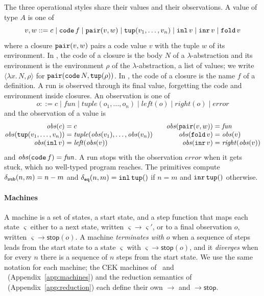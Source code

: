 The three operational styles share their values and their
observations. A value of type $A$ is one of
\[
  v, w ::= c \mid \mathtt{code}\,f \mid \mathtt{pair}(v, w) \mid \mathtt{tup}(v_1, \ldots, v_n)
    \mid \mathtt{inl}\,v \mid \mathtt{inr}\,v \mid \mathtt{fold}\,v
\]
where a closure $\mathtt{pair}(v, w)$ pairs a code value $v$ with the tuple
$w$ of its environment. In \fpc, the code of a closure is the body $N$
of a $\lambda$-abstraction and its environment is the environment
$\rho$ of the $\lambda$-abstraction, a list of values; we write
$\langle \lambda x.\,N, \rho\rangle$ for $\mathtt{pair}(\mathtt{code}\,N,
\mathtt{tup}(\rho))$. In \instr, the code of a closure is the name $f$ of a
definition. A run is observed through its final value, forgetting the
code and environment inside closures. An observation is one of
\[
  o ::= c \mid \mathit{fun} \mid \mathit{tuple}(o_1, \ldots, o_n)
    \mid \mathit{left}(o) \mid \mathit{right}(o) \mid \mathit{error}
\]
and the observation of a value is
\[
\begin{array}{@{}r@{\;}c@{\;}l@{\qquad}r@{\;}c@{\;}l@{}}
  \mathit{obs}(c) & = & c &
  \mathit{obs}(\kw{pair}(v, w)) & = & \mathit{fun}\\
  \mathit{obs}(\kw{tup}(v_1, \ldots, v_n)) & = & \mathit{tuple}(\mathit{obs}(v_1), \ldots, \mathit{obs}(v_n)) &
  \mathit{obs}(\kw{fold}\,v) & = & \mathit{obs}(v)\\
  \mathit{obs}(\kw{inl}\,v) & = & \mathit{left}(\mathit{obs}(v)) &
  \mathit{obs}(\kw{inr}\,v) & = & \mathit{right}(\mathit{obs}(v))
\end{array}
\]
and $\mathit{obs}(\mathtt{code}\,f) = \mathit{fun}$. A run stops
with the observation $\mathit{error}$ when it gets stuck, which no well-typed program
reaches. The primitives compute $\delta_{\mathtt{sub}}(n, m) = n - m$ and
$\delta_{\mathtt{eq}}(n, m) = \mathtt{inl}\,\mathtt{tup}()$ if $n = m$ and
$\mathtt{inr}\,\mathtt{tup}()$ otherwise.

\paragraph{Machines}

A machine is a set of states, a start state, and a step function that
maps each state $\varsigma$ either to a next state, written $\varsigma \longrightarrow \varsigma'$, or to a final observation $o$, written $\varsigma \longrightarrow \mathsf{stop}(o)$. A machine \emph{terminates with} $o$ when a sequence of steps leads from the start state to a state $\varsigma$ with $\varsigma \longrightarrow \mathsf{stop}(o)$, and it \emph{diverges} when
for every $n$ there is a sequence of $n$ steps from the start state. We use the same notation for each machine; the CEK
machines of \fpc\ and \instr\ (Appendix~\ref{app:machines}) and
the reduction semantics of \fpc\ (Appendix~\ref{app:reduction})
each define their own $\longrightarrow$ and $\longrightarrow
\mathsf{stop}$.

